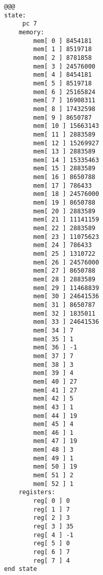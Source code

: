\documentclass[14pt]{article}
\begin{document}
\begin{lstlisting}[style=assembly]
@@@
state:
     pc 7
    memory:
        mem[ 0 ] 8454181
        mem[ 1 ] 8519718
        mem[ 2 ] 8781858
        mem[ 3 ] 24576000
        mem[ 4 ] 8454181
        mem[ 5 ] 8519718
        mem[ 6 ] 25165824
        mem[ 7 ] 16908311
        mem[ 8 ] 17432598
        mem[ 9 ] 8650787
        mem[ 10 ] 15663143
        mem[ 11 ] 2883589
        mem[ 12 ] 15269927
        mem[ 13 ] 2883589
        mem[ 14 ] 15335463
        mem[ 15 ] 2883589
        mem[ 16 ] 8650788
        mem[ 17 ] 786433
        mem[ 18 ] 24576000
        mem[ 19 ] 8650788
        mem[ 20 ] 2883589
        mem[ 21 ] 11141159
        mem[ 22 ] 2883589
        mem[ 23 ] 11075623
        mem[ 24 ] 786433
        mem[ 25 ] 1310722
        mem[ 26 ] 24576000
        mem[ 27 ] 8650788
        mem[ 28 ] 2883589
        mem[ 29 ] 11468839
        mem[ 30 ] 24641536
        mem[ 31 ] 8650787
        mem[ 32 ] 1835011
        mem[ 33 ] 24641536
        mem[ 34 ] 7
        mem[ 35 ] 1
        mem[ 36 ] -1
        mem[ 37 ] 7
        mem[ 38 ] 3
        mem[ 39 ] 4
        mem[ 40 ] 27
        mem[ 41 ] 27
        mem[ 42 ] 5
        mem[ 43 ] 1
        mem[ 44 ] 19
        mem[ 45 ] 4
        mem[ 46 ] 1
        mem[ 47 ] 19
        mem[ 48 ] 3
        mem[ 49 ] 1
        mem[ 50 ] 19
        mem[ 51 ] 2
        mem[ 52 ] 1
    registers:
        reg[ 0 ] 0
        reg[ 1 ] 7
        reg[ 2 ] 3
        reg[ 3 ] 35
        reg[ 4 ] -1
        reg[ 5 ] 0
        reg[ 6 ] 7
        reg[ 7 ] 4
end state
\end{lstlisting}
\end{document}
